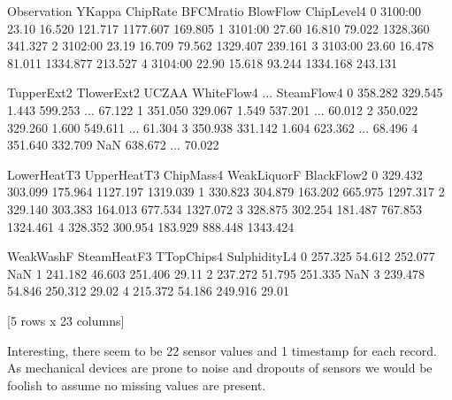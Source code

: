 \documentclass[letterpaper,10pt,english]{jupyterBook}
\begin{document}
\begin{sphinxVerbatim}[commandchars=\\\{\}]
  Observation  Y\PYGZhy{}Kappa  ChipRate  BF\PYGZhy{}CMratio  BlowFlow  ChipLevel4   \PYGZbs{}
0    31\PYGZhy{}00:00    23.10    16.520     121.717  1177.607      169.805   
1    31\PYGZhy{}01:00    27.60    16.810      79.022  1328.360      341.327   
2    31\PYGZhy{}02:00    23.19    16.709      79.562  1329.407      239.161   
3    31\PYGZhy{}03:00    23.60    16.478      81.011  1334.877      213.527   
4    31\PYGZhy{}04:00    22.90    15.618      93.244  1334.168      243.131   

   T\PYGZhy{}upperExt\PYGZhy{}2   T\PYGZhy{}lowerExt\PYGZhy{}2    UCZAA  WhiteFlow\PYGZhy{}4   ...  SteamFlow\PYGZhy{}4   \PYGZbs{}
0        358.282         329.545  1.443       599.253  ...        67.122   
1        351.050         329.067  1.549       537.201  ...        60.012   
2        350.022         329.260  1.600       549.611  ...        61.304   
3        350.938         331.142  1.604       623.362  ...        68.496   
4        351.640         332.709    NaN       638.672  ...        70.022   

   Lower\PYGZhy{}HeatT\PYGZhy{}3  Upper\PYGZhy{}HeatT\PYGZhy{}3   ChipMass\PYGZhy{}4   WeakLiquorF   BlackFlow\PYGZhy{}2   \PYGZbs{}
0        329.432         303.099      175.964      1127.197      1319.039   
1        330.823         304.879      163.202       665.975      1297.317   
2        329.140         303.383      164.013       677.534      1327.072   
3        328.875         302.254      181.487       767.853      1324.461   
4        328.352         300.954      183.929       888.448      1343.424   

   WeakWashF   SteamHeatF\PYGZhy{}3   T\PYGZhy{}Top\PYGZhy{}Chips\PYGZhy{}4   SulphidityL\PYGZhy{}4   
0     257.325         54.612         252.077             NaN  
1     241.182         46.603         251.406           29.11  
2     237.272         51.795         251.335             NaN  
3     239.478         54.846         250.312           29.02  
4     215.372         54.186         249.916           29.01  

[5 rows x 23 columns]
\end{sphinxVerbatim}

\sphinxAtStartPar
Interesting, there seem to be 22 sensor values and 1 timestamp for each record. As mechanical devices are prone to noise and dropouts of sensors we would be foolish to assume no missing values are present.
\end{document}
